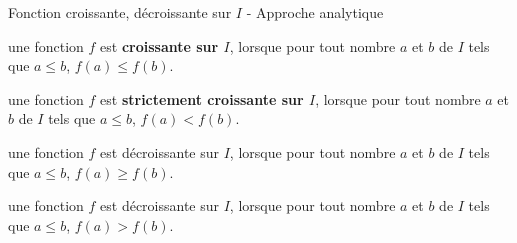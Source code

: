  

\begin{DefT}{Fonction croissante, décroissante sur $I$  - Approche analytique }
\begin{description}[leftmargin=*]
\item[•] une fonction $f$ est \textbf{croissante sur $I$}, lorsque pour tout nombre $a$ et $b$ de $I$ tels que $a \leq b$, $f(a) \leq f(b)$.
\item[•] une fonction $f$ est \textbf{strictement croissante sur $I$}, lorsque pour tout nombre $a$ et $b$ de $I$ tels que $a \leq b$, $f(a) < f(b)$.
\item[•] une fonction $f$ est décroissante sur $I$, lorsque pour tout nombre $a$ et $b$ de $I$ tels que $a \leq b$, $f(a) \geq f(b)$.
\item[•] une fonction $f$ est décroissante sur $I$, lorsque pour tout nombre $a$ et $b$ de $I$ tels que $a \leq b$, $f(a) > f(b)$.
\end{description} 
\end{DefT}

 






\begin{minipage}{0.47\linewidth}
\end{minipage}
\hfill
\begin{minipage}{0.47\linewidth}
\end{minipage}


\begin{minipage}{0.5\linewidth}
\end{minipage}
\hfill
\begin{minipage}{0.47\linewidth}
\end{minipage}

 





 



